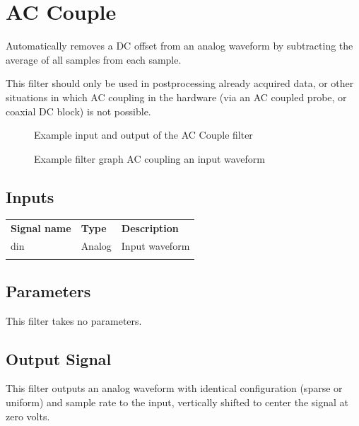 \pagebreak
\section{AC Couple}
\label{filter:accouple}

Automatically removes a DC offset from an analog waveform by subtracting the average of all samples from each sample.

This filter should only be used in postprocessing already acquired data, or other situations in which AC coupling in
the hardware (via an AC coupled probe, or coaxial DC block) is not possible.

\begin{figure}[h]
\centering
{}
\caption{Example input and output of the AC Couple filter}
\label{filter_accouple}
\end{figure}

\begin{figure}[h]
\centering
{}
\caption{Example filter graph AC coupling an input waveform}
\label{filter_graph_accouple}
\end{figure}
\FloatBarrier

\subsection{Inputs}

\begin{tabularx}{16cm}{llX}
\thickhline
\textbf{Signal name} & \textbf{Type} & \textbf{Description} \\
\thickhline
din & Analog & Input waveform \\
\thickhline
\end{tabularx}

\subsection{Parameters}

This filter takes no parameters.

\subsection{Output Signal}

This filter outputs an analog waveform with identical configuration (sparse or uniform) and sample rate to the input,
vertically shifted to center the signal at zero volts.

